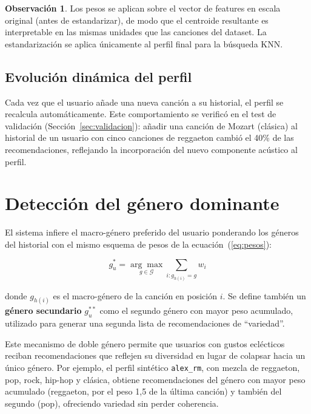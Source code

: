 \documentclass[12pt, a4paper]{book}
\theoremstyle{definition}
\newtheorem{observacion}{Observación}[chapter]
\begin{document}
\begin{observacion}
Los pesos se aplican sobre el vector de features en escala original
(antes de estandarizar), de modo que el centroide resultante es
interpretable en las mismas unidades que las canciones del dataset.
La estandarización se aplica únicamente al perfil final para la búsqueda KNN.
\end{observacion}

\subsection{Evolución dinámica del perfil}

Cada vez que el usuario añade una nueva canción a su historial, el perfil
se recalcula automáticamente. Este comportamiento se verificó en el test
de validación (Sección~\ref{sec:validacion}): añadir una canción de Mozart
(clásica) al historial de un usuario con cinco canciones de reggaeton cambió
el 40\% de las recomendaciones, reflejando la incorporación del nuevo
componente acústico al perfil.

\section{Detección del género dominante}
\label{sec:genero_dominante}

El sistema infiere el macro-género preferido del usuario ponderando los
géneros del historial con el mismo esquema de pesos de la
ecuación~(\ref{eq:pesos}):

\begin{equation}
\label{eq:genero_dom}
g_u^* = \underset{g \in \mathcal{G}}{\arg\max} \sum_{i : g_{h(i)} = g} w_i
\end{equation}

donde $g_{h(i)}$ es el macro-género de la canción en posición $i$.
Se define también un \textbf{género secundario} $g_u^{**}$ como el segundo
género con mayor peso acumulado, utilizado para generar una segunda lista
de recomendaciones de ``variedad''.

Este mecanismo de doble género permite que usuarios con gustos eclécticos
reciban recomendaciones que reflejen su diversidad en lugar de colapsar
hacia un único género. Por ejemplo, el perfil sintético \texttt{alex\_rm},
con mezcla de reggaeton, pop, rock, hip-hop y clásica, obtiene
recomendaciones del género con mayor peso acumulado (reggaeton, por el peso
1{,}5 de la última canción) y también del segundo (pop), ofreciendo variedad
sin perder coherencia.
\end{document}
